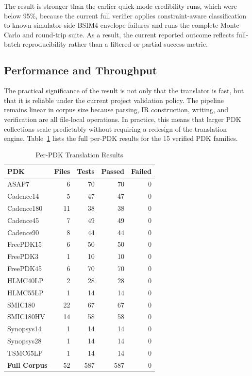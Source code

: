 \documentclass[10pt,twocolumn]{article}
\begin{document}
The result is stronger than the earlier quick-mode credibility runs, which were below 95\%, because the current full verifier applies constraint-aware classification to known simulator-side BSIM4 envelope failures and runs the complete Monte Carlo and round-trip suite. As a result, the current reported outcome reflects full-batch reproducibility rather than a filtered or partial success metric.

\subsection{Performance and Throughput}

The practical significance of the result is not only that the translator is fast, but that it is reliable under the current project validation policy. The pipeline remains linear in corpus size because parsing, IR construction, writing, and verification are all file-local operations. In practice, this means that larger PDK collections scale predictably without requiring a redesign of the translation engine. Table~\ref{tab:pdk-results} lists the full per-PDK results for the 15 verified PDK families.

\begin{table}[!t]
\caption{Per-PDK Translation Results}
\label{tab:pdk-results}
\centering
\renewcommand{\arraystretch}{1.1}
\begin{tabular}{@{}lrrrr@{}}
\toprule
\textbf{PDK} & \textbf{Files} & \textbf{Tests} & \textbf{Passed} & \textbf{Failed} \\
\midrule
ASAP7 & 6 & 70 & 70 & 0 \\
Cadence14 & 5 & 47 & 47 & 0 \\
Cadence180 & 11 & 38 & 38 & 0 \\
Cadence45 & 7 & 49 & 49 & 0 \\
Cadence90 & 8 & 44 & 44 & 0 \\
FreePDK15 & 6 & 50 & 50 & 0 \\
FreePDK3 & 1 & 10 & 10 & 0 \\
FreePDK45 & 6 & 70 & 70 & 0 \\
HLMC40LP & 2 & 28 & 28 & 0 \\
HLMC55LP & 1 & 14 & 14 & 0 \\
SMIC180 & 22 & 67 & 67 & 0 \\
SMIC180HV & 14 & 58 & 58 & 0 \\
Synopsys14 & 1 & 14 & 14 & 0 \\
Synopsys28 & 1 & 14 & 14 & 0 \\
TSMC65LP & 1 & 14 & 14 & 0 \\
\midrule
\textbf{Full Corpus} & 52 & 587 & 587 & 0 \\
\bottomrule
\end{tabular}
\end{table}
\end{document}
